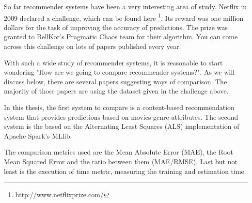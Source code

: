 %
%
%
%

So far recommender systems have been a very interesting area of study. Netflix in 2009 declared a challenge, which can be found here \footnote{http://www.netflixprize.com/}. Its reward was one million dollars for the task of improving the accuracy of predictions. The prize was granted to BellKor’s Pragmatic Chaos team for their algorithm. You can come across this challenge on lots of papers published every year.

With such a wide study of recommender systems, it is reasonable to start wondering "How are we going to compare recommender systems?". As we will discuss below, there are several papers suggesting ways of comparison. The majority of those papers are using the dataset given in the challenge above.

In this thesis, the first system to compare is a content-based recommendation system that provides predictions based on movies genre attributes. The second system is the based on the Alternating Least Squares (ALS) implementation of Apache Spark's MLlib.

The comparison metrics used are the Mean Absolute Error (MAE), the Root Mean Squared Error and the ratio between them (MAE/RMSE). Last but not least is the execution of time metric, measuring the training and estimation time.

